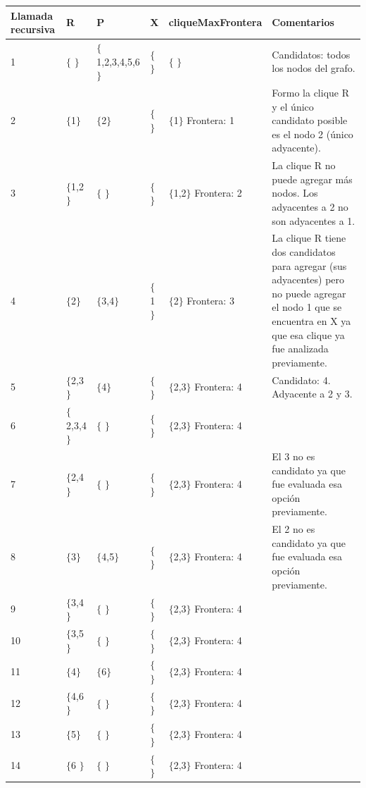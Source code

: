 \begin{center}
    \begin{tabular}{ | l | l | l | l | l | p{5cm} |}
    \hline
    Llamada recursiva & R & P & X & cliqueMaxFrontera & Comentarios \\ \hline
    1 & $\{$ $\}$ & $\{$1,2,3,4,5,6$\}$ & $\{$ $\}$ & $\{$ $\}$ & Candidatos: todos los nodos del grafo. \\ \hline
    2 & $\{$1$\}$ & $\{$2$\}$ & $\{$ $\}$ & $\{$1$\}$ Frontera: 1 & Formo la clique R y el único candidato posible es el nodo 2 (único adyacente).\\ \hline
    3 & $\{$1,2$\}$ & $\{$ $\}$ & $\{$ $\}$ & $\{$1,2$\}$ Frontera: 2 & La clique R no puede agregar más nodos. Los adyacentes a 2 no son adyacentes a 1. \\ \hline
    4 & $\{$2$\}$ & $\{$3,4$\}$ & $\{$1$\}$ & $\{$2$\}$ Frontera: 3 & La clique R tiene dos candidatos para agregar (sus adyacentes) pero no puede agregar el nodo 1 que se encuentra en X ya que esa clique ya fue analizada previamente.\\ \hline
    5 & $\{$2,3$\}$ & $\{$4$\}$ & $\{$ $\}$ & $\{$2,3$\}$ Frontera: 4 & Candidato: 4. Adyacente a 2 y 3.\\ \hline
    6 & $\{$2,3,4$\}$ & $\{$ $\}$ & $\{$ $\}$ & $\{$2,3$\}$ Frontera: 4  &\\ \hline
    7 & $\{$2,4$\}$ & $\{$ $\}$ & $\{$ $\}$ & $\{$2,3$\}$ Frontera: 4 & El 3 no es candidato ya que fue evaluada esa opción previamente. \\ \hline
    8 & $\{$3$\}$ & $\{$4,5$\}$ & $\{$ $\}$ & $\{$2,3$\}$ Frontera: 4 & El 2 no es candidato ya que fue evaluada esa opción previamente.\\ \hline
    9 & $\{$3,4$\}$ & $\{$ $\}$ & $\{$ $\}$ & $\{$2,3$\}$ Frontera: 4 & \\ \hline
    10 & $\{$3,5$\}$ & $\{$ $\}$ & $\{$ $\}$ & $\{$2,3$\}$ Frontera: 4 & \\ \hline
    11 & $\{$4$\}$ & $\{$6$\}$ & $\{$ $\}$ & $\{$2,3$\}$ Frontera: 4 & \\ \hline
    12 & $\{$4,6$\}$ & $\{$ $\}$ & $\{$ $\}$ & $\{$2,3$\}$ Frontera: 4 & \\ \hline
    13 & $\{$5$\}$ & $\{$ $\}$ & $\{$ $\}$ & $\{$2,3$\}$ Frontera: 4 & \\ \hline
    14 & $\{$6 $\}$ & $\{$ $\}$ & $\{$ $\}$ & $\{$2,3$\}$ Frontera: 4 & \\
	\hline
    \end{tabular}
\end{center}

